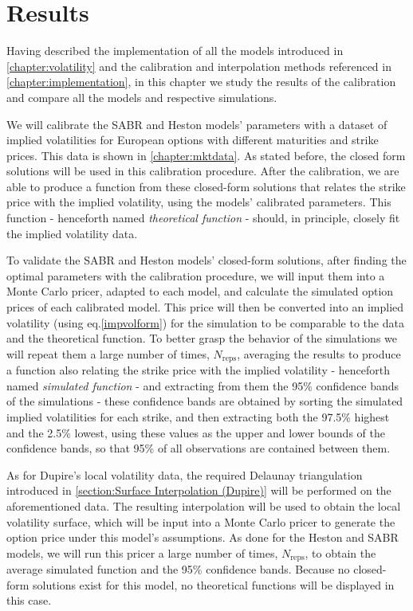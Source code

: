 \chapter{Results}
\label{chapter:results}
Having described the implementation of all the models introduced in \autoref{chapter:volatility} and the calibration and interpolation methods referenced in \autoref{chapter:implementation}, in this chapter we study the results of the calibration and compare all the models and respective simulations.

We will calibrate the SABR and Heston models' parameters with a dataset of implied volatilities for European options with different maturities and strike prices. This data is shown in \autoref{chapter:mktdata}. As stated before, the closed form solutions will be used in this calibration procedure. After the calibration, we are able to produce a function from these closed-form solutions that relates the strike price with the implied volatility, using the models' calibrated parameters. This function - henceforth named \emph{theoretical function} - should, in principle, closely fit the implied volatility data.

To validate the SABR and Heston models' closed-form solutions, after finding the optimal parameters with the calibration procedure, we will input them into a Monte Carlo pricer, adapted to each model, and calculate the simulated option prices of each calibrated model. This price will then be converted into an implied volatility (using eq.\eqref{impvolform}) for the simulation to be comparable to the data and the theoretical function. To better grasp the behavior of the simulations we will repeat them a large number of times, $N_{\mathrm{reps}}$, averaging the results to produce a function also relating the strike price with the implied volatility - henceforth named \emph{simulated function} -  and extracting from them the 95\% confidence bands of the simulations - these confidence bands are obtained by sorting the simulated implied volatilities for each strike, and then extracting both the 97.5\% highest and the 2.5\% lowest, using these values as the upper and lower bounds of the confidence bands, so that 95\% of all observations are contained between them.



As for Dupire's local volatility data, the required Delaunay triangulation introduced in \autoref{section:Surface Interpolation (Dupire)} will be performed on the aforementioned data. The resulting interpolation will be used to obtain the local volatility surface, which will be input into a Monte Carlo pricer to generate the option price under this model's assumptions. As done for the Heston and SABR models, we will run this pricer a large number of times, $N_{\mathrm{reps}}$, to obtain the average simulated function and the 95\% confidence bands. Because no closed-form solutions exist for this model, no theoretical functions will be displayed in this case.



